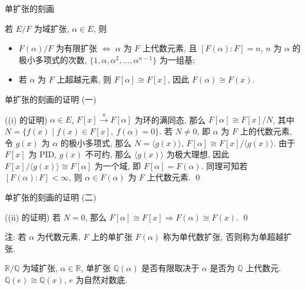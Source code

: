 \begin{frame}{单扩张的刻画}

\begin{lem}[单扩张的刻画]
若 $E/F$ 为域扩张, $\alpha \in E$, 则
\begin{itemize}
\item[(i)] $F(\alpha)/F$ 为有限扩张 $\iff$ $\alpha$ 为 $F$ 上代数元素,
  且 $[F(\alpha):F] = n$, $n$ 为 $\alpha$ 的极小多项式的次数,
  $\{ 1, \alpha, \alpha^2, \dots, \alpha^{n-1} \}$ 为一组基;
\item[(ii)] 若 $\alpha$ 为 $F$ 上超越元素, 则 $F[\alpha] \cong F[x]$,
  因此 $F(\alpha) \cong F(x)$.
\end{itemize}
\end{lem}

\end{frame}


\begin{frame}{单扩张的刻画的证明 (一)}

\startproof[bg=yellow, fg=red]((i) 的证明)
$\alpha \in E$,
$F[x] \xrightarrow{\ \pi\ } F[\alpha]$ 为环的满同态,
那么 $F[\alpha] \cong F[x]/N$,
其中 $N = \{ f(x) \mid f(x) \in F[x],\ f(\alpha) = 0 \}$.
若 $N \neq 0$, 即 $\alpha$ 为 $F$ 上的代数元素, 令 $g(x)$ 为 $\alpha$
的极小多项式, 那么 $N = \langle g(x) \rangle$,
$F[\alpha] \cong F[x]/\langle g(x) \rangle$.
由于 $F[x]$ 为 PID, $g(x)$ 不可约, 那么 $\langle g(x) \rangle$ 为极大理想,
因此 $F[x]/\langle g(x) \rangle \cong F[\alpha]$ 为一个域, 即 $F[\alpha] = F(\alpha)$.
同理可知若 $[F(\alpha):F] < \infty$, 则 $\alpha \in F(\alpha)$ 为 $F$ 上代数元素.
\qed

\end{frame}


\begin{frame}{单扩张的刻画的证明 (二)}

\startproof[bg=yellow, fg=red]((ii) 的证明)
若 $N = 0$, 那么 $F[\alpha] \cong F[x] \Longrightarrow F(\alpha) \cong F(x)$.
\qed

\pause

注: 若 $\alpha$ 为代数元素, $F$ 上的单扩张 $F(\alpha)$ 称为单代数扩张,
否则称为单超越扩张.

\pause

\begin{eg}
$\mathbb{R}/\mathbb{Q}$ 为域扩张, $\alpha \in \mathbb{R}$,
单扩张 $\mathbb{Q}(\alpha)$ 是否有限取决于 $\alpha$ 是否为 $\mathbb{Q}$
上代数元. $\mathbb{Q}(e) \cong \mathbb{Q}(x)$, $e$ 为自然对数底.
\end{eg}

\end{frame}

